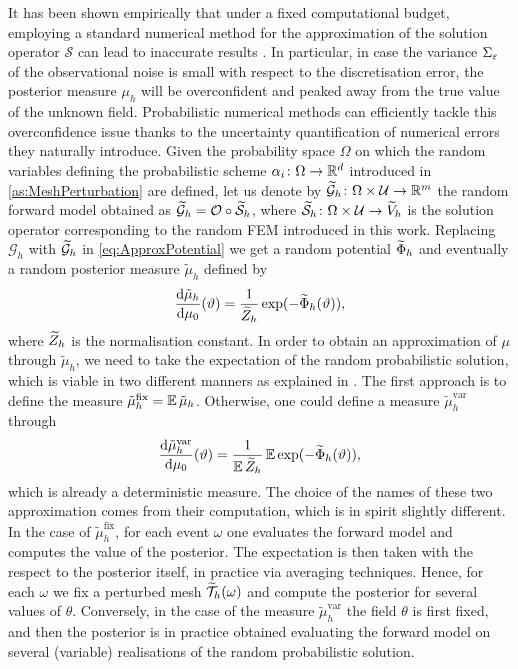 \documentclass[10pt]{article}
\begin{document}
It has been shown empirically that under a fixed computational budget, employing a standard numerical method for the approximation of the solution operator $\mathcal S$ can lead to inaccurate results \cite{AbG18, CGS17, COS17}. In particular, in case the variance $\Sigma_\varepsilon$ of the observational noise is small with respect to the discretisation error, the posterior measure $\mu_h$ will be overconfident and peaked away from the true value of the unknown field. Probabilistic numerical methods can efficiently tackle this overconfidence issue thanks to the uncertainty quantification of numerical errors they naturally introduce. Given the probability space $\Omega$ on which the random variables defining the probabilistic scheme $\alpha_i \colon \Omega \to \mathbb{R}^d$ introduced in \cref{as:MeshPerturbation} are defined, let us denote by $\widetilde{\mathcal G}_h \colon \Omega \times \mathcal U \to \mathbb{R}^m$ the random forward model obtained as $\widetilde{\mathcal G}_h = \mathcal O \circ \widetilde{\mathcal S}_h$, where $\widetilde{\mathcal S}_h \colon \Omega \times \mathcal U \to \widetilde V_h$ is the solution operator corresponding to the random FEM introduced in this work. Replacing $\mathcal G_h$ with $\widetilde{\mathcal G}_h$ in \eqref{eq:ApproxPotential} we get a random potential $\widetilde \Phi_h$ and eventually a random posterior measure $\tilde \mu_h$ defined by
\begin{equation}
	\frac{\mathrm{d} \tilde \mu_h}{\mathrm{d} \mu_0}(\vartheta) = \frac{1}{\widetilde Z_h}\exp(-\widetilde \Phi_h(\vartheta)),
\end{equation}
where $\widetilde Z_h$ is the normalisation constant. In order to obtain an approximation of $\mu$ through $\tilde \mu_h$, we need to take the expectation of the random probabilistic solution, which is viable in two different manners as explained in \cite{LST18}. The first approach is to define the measure $\tilde \mu_h^{\mathrm{fix}} = \operatorname{\mathbb{E}} \tilde \mu_h$. Otherwise, one could define a measure $\tilde \mu_h^{\mathrm{var}}$ through
\begin{equation}
	\frac{\mathrm{d} \tilde \mu_h^{\mathrm{var}}}{\mathrm{d} \mu_0}(\vartheta) = \frac{1}{\operatorname{\mathbb{E}} \widetilde Z_h} \operatorname{\mathbb{E}} \exp(-\widetilde \Phi_h(\vartheta)),
\end{equation}
which is already a deterministic measure. The choice of the names of these two approximation comes from their computation, which is in spirit slightly different. In the case of $\tilde \mu_h^{\mathrm{fix}}$, for each event $\omega$ one evaluates the forward model and computes the value of the posterior. The expectation is then taken with the respect to the posterior itself, in practice via averaging techniques. Hence, for each $\omega$ we fix a perturbed mesh $\widetilde {\mathcal T}_h(\omega)$ and compute the posterior for several values of $\theta$. Conversely, in the case of the measure $\tilde \mu_h^{\mathrm{var}}$ the field $\theta$ is first fixed, and then the posterior is in practice obtained evaluating the forward model on several (variable) realisations of the random probabilistic solution.
\end{document}
